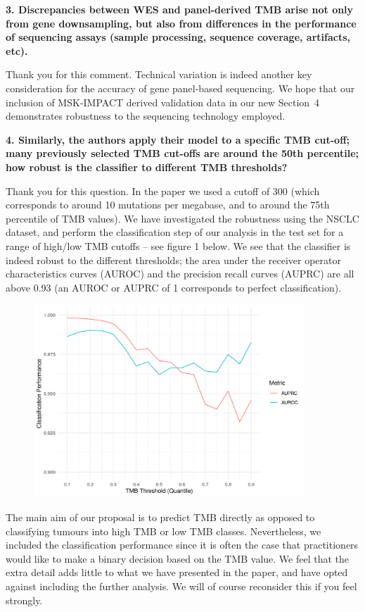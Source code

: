 \documentclass[12pt]{article}
\begin{document}
\textbf{3. Discrepancies between WES and panel-derived TMB arise not only from gene downsampling, but also from differences in the performance of sequencing assays (sample processing, sequence coverage, artifacts, etc).}

Thank you for this comment. Technical variation is indeed another key consideration for the accuracy of gene panel-based sequencing. We hope that our inclusion of MSK-IMPACT derived validation data in our new Section~4 demonstrates robustness to the sequencing technology employed. 

\textbf{4. Similarly, the authors apply their model to a specific TMB cut-off; many previously selected TMB cut-offs are around the 50th percentile; how robust is the classifier to different TMB thresholds?}

Thank you for this question.   In the paper we used a cutoff of 300 (which corresponds to around 10 mutations per megabase, and to around the 75th percentile of TMB values).  We have investigated the robustness using the NSCLC dataset, and perform the classification step of our analysis in the test set for a range of high/low TMB cutoffs -- see figure 1 below. We see that the classifier is indeed robust to the different thresholds; the area under the receiver operator characteristics curves (AUROC) and the precision recall curves (AUPRC) are all above 0.93 (an AUROC or AUPRC of 1 corresponds to perfect classification). 

\begin{figure}[htbp]
\centering
\includegraphics[width=4in]{../../results/figures/quantile_thresholds_fig.png}
\caption{}
\end{figure} 

The main aim of our proposal is to predict TMB directly as opposed to classifying tumours into high TMB or low TMB classes. Nevertheless, we included the classification performance since it is often the case that practitioners would like to make a binary decision based on the TMB value. We feel that the extra detail adds little to what we have presented in the paper, and have opted against including the further analysis.  We will of course reconsider this if you feel strongly.  
\end{document}
